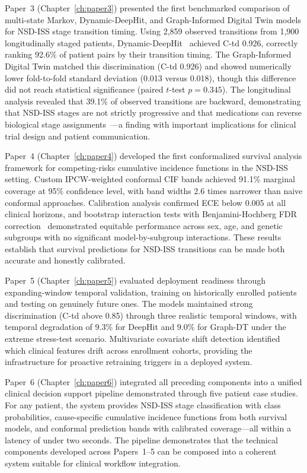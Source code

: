 Paper~3 (Chapter~\ref{ch:paper3}) presented the first benchmarked comparison of multi-state Markov, Dynamic-DeepHit, and Graph-Informed Digital Twin models for NSD-ISS stage transition timing. Using 2,859 observed transitions from 1,900 longitudinally staged patients, Dynamic-DeepHit~\cite{lee2018} achieved C-td 0.926, correctly ranking 92.6\% of patient pairs by their transition timing. The Graph-Informed Digital Twin matched this discrimination (C-td 0.926) and showed numerically lower fold-to-fold standard deviation (0.013 versus 0.018), though this difference did not reach statistical significance (paired $t$-test $p{=}0.345$). The longitudinal analysis revealed that 39.1\% of observed transitions are backward, demonstrating that NSD-ISS stages are not strictly progressive and that medications can reverse biological stage assignments~\cite{espay2025,simuni2025}---a finding with important implications for clinical trial design and patient communication.

Paper~4 (Chapter~\ref{ch:paper4}) developed the first conformalized survival analysis framework for competing-risks cumulative incidence functions in the NSD-ISS setting. Custom IPCW-weighted conformal CIF bands achieved 91.1\% marginal coverage at 95\% confidence level, with band widths 2.6 times narrower than naive conformal approaches. Calibration analysis confirmed ECE below 0.005 at all clinical horizons, and bootstrap interaction tests with Benjamini-Hochberg FDR correction~\cite{benjamini1995} demonstrated equitable performance across sex, age, and genetic subgroups with no significant model-by-subgroup interactions. These results establish that survival predictions for NSD-ISS transitions can be made both accurate and honestly calibrated.

Paper~5 (Chapter~\ref{ch:paper5}) evaluated deployment readiness through expanding-window temporal validation, training on historically enrolled patients and testing on genuinely future ones. The models maintained strong discrimination (C-td above 0.85) through three realistic temporal windows, with temporal degradation of 9.3\% for DeepHit and 9.0\% for Graph-DT under the extreme stress-test scenario. Multivariate covariate shift detection identified which clinical features drift across enrollment cohorts, providing the infrastructure for proactive retraining triggers in a deployed system.

Paper~6 (Chapter~\ref{ch:paper6}) integrated all preceding components into a unified clinical decision support pipeline demonstrated through five patient case studies. For any patient, the system provides NSD-ISS stage classification with class probabilities, cause-specific cumulative incidence functions from both survival models, and conformal prediction bands with calibrated coverage---all within a latency of under two seconds. The pipeline demonstrates that the technical components developed across Papers~1--5 can be composed into a coherent system suitable for clinical workflow integration.

